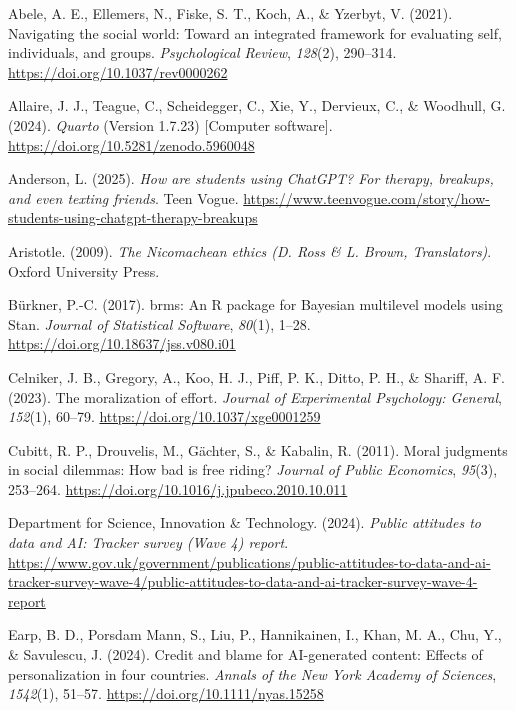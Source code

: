 \documentclass[
  man,
  floatsintext,
  longtable,
  nolmodern,
  notxfonts,
  notimes,
  colorlinks=true,linkcolor=blue,citecolor=blue,urlcolor=blue]{apa7}
\newlength{\cslhangindent}
\newenvironment{CSLReferences}[2] %
 {\begin{list}{}{%
  \setlength{\itemindent}{0pt}
  \setlength{\leftmargin}{0pt}
  \setlength{\parsep}{0pt}
  \ifodd #1
   \setlength{\leftmargin}{\cslhangindent}
   \setlength{\itemindent}{-1\cslhangindent}
  \fi
  \setlength{\itemsep}{#2\baselineskip}}}
 {\end{list}}
\begin{document}
\label{refs}
\begin{CSLReferences}{1}{0}
Abele, A. E., Ellemers, N., Fiske, S. T., Koch, A., \& Yzerbyt, V.
(2021). Navigating the social world: Toward an integrated framework for
evaluating self, individuals, and groups. \emph{Psychological Review},
\emph{128}(2), 290--314. \url{https://doi.org/10.1037/rev0000262}

Allaire, J. J., Teague, C., Scheidegger, C., Xie, Y., Dervieux, C., \&
Woodhull, G. (2024). \emph{{Quarto}} (Version 1.7.23) {[}Computer
software{]}. \url{https://doi.org/10.5281/zenodo.5960048}

Anderson, L. (2025). \emph{How are students using {ChatGPT}? For
therapy, breakups, and even texting friends}. Teen Vogue.
\url{https://www.teenvogue.com/story/how-students-using-chatgpt-therapy-breakups}

Aristotle. (2009). \emph{The {Nicomachean} ethics {(D. Ross \& L. Brown,
Translators)}}. Oxford University Press.

Bürkner, P.-C. (2017). {brms}: An {R} package for {Bayesian} multilevel
models using {Stan}. \emph{Journal of Statistical Software},
\emph{80}(1), 1--28. \url{https://doi.org/10.18637/jss.v080.i01}

Celniker, J. B., Gregory, A., Koo, H. J., Piff, P. K., Ditto, P. H., \&
Shariff, A. F. (2023). The moralization of effort. \emph{Journal of
Experimental Psychology: General}, \emph{152}(1), 60--79.
\url{https://doi.org/10.1037/xge0001259}

Cubitt, R. P., Drouvelis, M., Gächter, S., \& Kabalin, R. (2011). Moral
judgments in social dilemmas: How bad is free riding? \emph{Journal of
Public Economics}, \emph{95}(3), 253--264.
\url{https://doi.org/10.1016/j.jpubeco.2010.10.011}

Department for Science, Innovation \& Technology. (2024). \emph{Public
attitudes to data and {AI}: Tracker survey ({Wave 4}) report}.
\url{https://www.gov.uk/government/publications/public-attitudes-to-data-and-ai-tracker-survey-wave-4/public-attitudes-to-data-and-ai-tracker-survey-wave-4-report}

Earp, B. D., Porsdam Mann, S., Liu, P., Hannikainen, I., Khan, M. A.,
Chu, Y., \& Savulescu, J. (2024). Credit and blame for AI-generated
content: Effects of personalization in four countries. \emph{Annals of
the New York Academy of Sciences}, \emph{1542}(1), 51--57.
\url{https://doi.org/10.1111/nyas.15258}


\end{CSLReferences}
\end{document}
